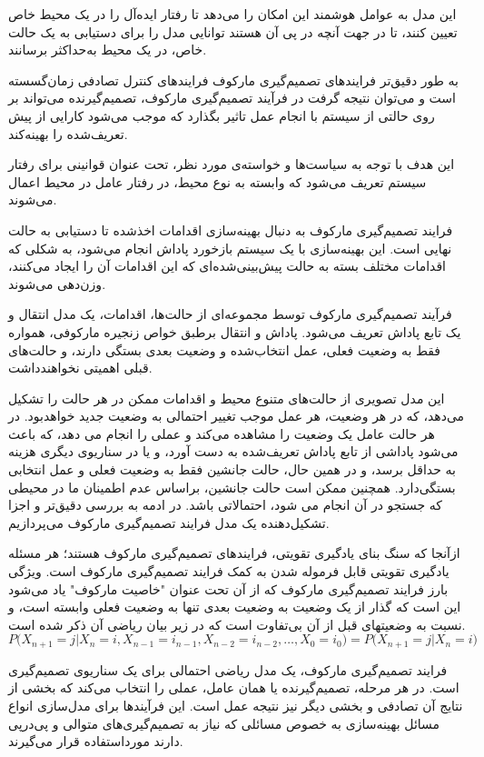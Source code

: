 این مدل به عوامل هوشمند این امکان را می‌دهد تا رفتار ایده‌آل را در یک محیط خاص تعیین کنند، تا در جهت آنچه در پی آن هستند توانایی مدل را برای دستیابی به یک حالت خاص، در یک محیط به‌حداکثر برسانند. 

به طور دقیق‌تر فرایندهای تصمیم‌گیری مارکوف فرایندهای کنترل تصادفی زمان‌گسسته است و می‌توان نتیجه گرفت در فرآیند تصمیم‌گیری مارکوف، تصمیم‌گیرنده می‌تواند بر روی حالتی از سیستم با انجام عمل تاثیر بگذارد که موجب می‌شود کارایی از پیش ‌تعریف‌شده را بهینه‌کند. 


این هدف با توجه به سیاست‌ها و خواسته‌ی مورد نظر، تحت عنوان قوانینی برای رفتار سیستم تعریف می‌شود که وابسته به نوع محیط، در رفتار عامل در محیط اعمال می‌شوند. 

فرایند تصمیم‌گیری مارکوف به دنبال بهینه‌سازی اقدامات اخذشده تا دستیابی به حالت نهایی است. این بهینه‌سازی با یک سیستم بازخورد پاداش انجام می‌شود، به شکلی‌ که اقدامات مختلف بسته به حالت پیش‌بینی‌شده‌ای که این اقدامات آن را ایجاد می‌کنند، وزن‌دهی می‌شوند. 

فرآیند تصمیم‌گیری مارکوف توسط مجموعه‌ای از حالت‌ها، اقدامات، یک مدل انتقال و یک تابع پاداش تعریف می‌شود. پاداش و انتقال برطبق خواص زنجیره مارکوفی، همواره فقط به وضعیت فعلی، عمل انتخاب‌شده و وضعیت بعدی بستگی دارند، و حالت‌های قبلی اهمیتی نخواهندداشت. 

این مدل تصویری از حالت‌های متنوع محیط و اقدامات ممکن در هر حالت را تشکیل می‌دهد، که در هر وضعیت، هر عمل موجب تغییر احتمالی به وضعیت جدید خواهدبود. در هر حالت عامل یک وضعیت را مشاهده می‌کند و عملی را انجام می دهد، که باعث می‌شود پاداشی از تابع پاداش تعریف‌شده به دست آورد، و یا در سناریوی دیگری هزینه به حداقل برسد، و در همین حال، حالت جانشین فقط به وضعیت فعلی و عمل انتخابی بستگی‌دارد. همچنین ممکن است حالت جانشین، براساس عدم اطمینان ما در محیطی که جستجو در آن انجام می شود، احتمالاتی باشد. 
در ادمه به بررسی دقیق‌تر و اجزا تشکیل‌دهنده یک مدل فرایند تصمیم‌گیری مارکوف می‌پردازیم.  


ازآنجا که سنگ بنای یادگیری تقویتی، فرایندهای تصمیم‌گیری مارکوف هستند؛ هر مسئله یادگیری تقویتی قابل فرموله شدن به کمک فرایند تصمیم‌گیری مارکوف است. ویژگی بارز فرایند تصمیم‌گیری مارکوف که از آن تحت عنوان "خاصیت مارکوف" یاد می‌شود این است که گذار از یک وضعیت به وضعیت بعدی تنها به وضعیت فعلی وابسته است، و نسبت به وضعیتهای قبل از آن بی‌تفاوت است که در زیر بیان ریاضی آن ذکر شده است.
$$P\Big(X_{n+1} = j \Big| X_n = i, X_{n-1} = i_{n-1}, X_{n-2} = i_{n-2}, \ldots , X_0 = i_0\Big) = P\Big(X_{n+1} = j \Big| X_n = i \Big) $$

فرایند تصمیم‌گیری مارکوف، یک مدل ریاضی احتمالی برای یک سناریوی تصمیم‌گیری است. در هر مرحله، تصمیم‌گیرنده یا همان عامل، عملی را انتخاب می‌کند که بخشی از نتایج آن تصادفی و بخشی دیگر نیز نتیجه عمل است. این فرآیندها برای مدل‌سازی انواع مسائل بهینه‌سازی به خصوص مسائلی که نیاز به تصمیم‌گیری‌های متوالی و پی‌درپی دارند مورداستفاده قرار می‌گیرند.


